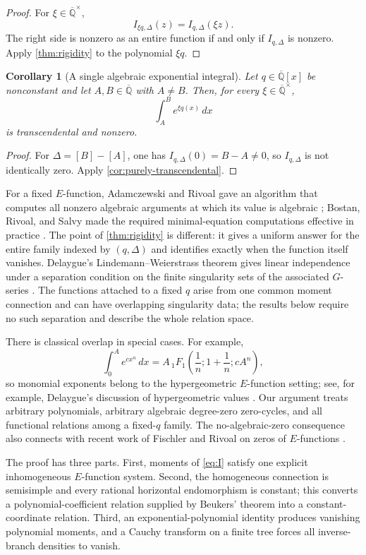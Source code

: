 \documentclass[11pt]{article}
\numberwithin{equation}{section}
\newtheorem{corollary}[corollary]{Corollary}
\theoremstyle{definition}
\theoremstyle{remark}
\newcommand{\Qbar}{\overline{\mathbb Q}}
\begin{document}
\begin{proof}
For $\xi\in\Qbar^\times$,
\[
  I_{\xi q,\Delta}(z)=I_{q,\Delta}(\xi z).
\]
The right side is nonzero as an entire function if and only if
$I_{q,\Delta}$ is nonzero.  Apply \cref{thm:rigidity} to the polynomial
$\xi q$.
\end{proof}

\begin{corollary}[A single algebraic exponential integral]
\label{cor:single}
Let $q\in\Qbar[x]$ be nonconstant and let $A,B\in\Qbar$ with $A\ne B$.
Then, for every $\xi\in\Qbar^\times$,
\[
  \int_A^B e^{\xi q(x)}\,dx
\]
is transcendental and nonzero.
\end{corollary}

\begin{proof}
For $\Delta=[B]-[A]$, one has $I_{q,\Delta}(0)=B-A\ne0$, so
$I_{q,\Delta}$ is not identically zero.  Apply
\cref{cor:purely-transcendental}.
\end{proof}

For a fixed $E$-function, Adamczewski and Rivoal gave an algorithm that
computes all nonzero algebraic arguments at which its value is algebraic
\cite{AdamczewskiRivoal}; Bostan, Rivoal, and Salvy made the required
minimal-equation computations effective in practice
\cite{BostanRivoalSalvy}.  The point of \cref{thm:rigidity} is different:
it gives a uniform answer for the entire family indexed by $(q,\Delta)$ and
identifies exactly when the function itself vanishes.  Delaygue's
Lindemann--Weierstrass theorem gives linear independence under a separation
condition on the finite singularity sets of the associated $G$-series
\cite{Delaygue}.  The functions attached to a fixed $q$ arise from one
common moment connection and can have overlapping singularity data; the
results below require no such separation and describe the whole relation
space.

There is classical overlap in special cases.  For example,
\[
  \int_0^A e^{cx^n}\,dx
  =A\,{}_1F_1\!\left(\frac1n;1+\frac1n;cA^n\right),
\]
so monomial exponents belong to the hypergeometric $E$-function setting;
see, for example, Delaygue's discussion of hypergeometric values
\cite{Delaygue}.  Our argument treats arbitrary polynomials, arbitrary
algebraic degree-zero zero-cycles, and all functional relations among a
fixed-$q$ family.  The no-algebraic-zero consequence also connects with
recent work of Fischler and Rivoal on zeros of $E$-functions
\cite{FischlerRivoalZeros}.

The proof has three parts.  First, moments of \eqref{eq:I} satisfy one
explicit inhomogeneous $E$-function system.  Second, the homogeneous
connection is semisimple and every rational horizontal endomorphism is
constant; this converts a polynomial-coefficient relation supplied by
Beukers' theorem into a constant-coordinate relation.  Third, an
exponential-polynomial identity produces vanishing polynomial moments, and
a Cauchy transform on a finite tree forces all inverse-branch densities to
vanish.
\end{document}
